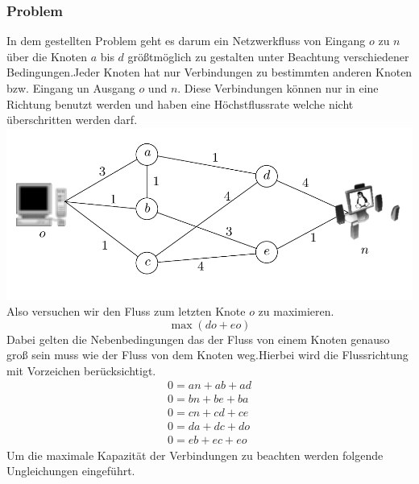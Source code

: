 \subsubsection{Problem}
	In dem gestellten Problem geht es darum ein Netzwerkfluss von Eingang $o$ zu $n$ über die Knoten $a$ bis $d$ größtmöglich zu gestalten unter Beachtung verschiedener Bedingungen.Jeder Knoten hat nur Verbindungen zu bestimmten anderen Knoten bzw. Eingang un Ausgang $o$ und $n$. Diese Verbindungen können nur in eine Richtung benutzt werden und haben eine Höchstflussrate welche nicht überschritten werden darf. 
	\includegraphics[width=\textwidth]{Grafiken/Netzwerkfluss_Bild.png}
	Also versuchen wir den Fluss zum letzten Knote $o$ zu maximieren.
	\[ \max(do+eo) \]
	Dabei gelten die Nebenbedingungen das der Fluss von einem Knoten genauso groß sein muss wie der Fluss von dem Knoten weg.Hierbei wird die Flussrichtung mit Vorzeichen berücksichtigt.
	\begin{align*}
		0=an+ab+ad\\
		0=bn+be+ba\\
		0=cn+cd+ce\\
		0=da+dc+do\\
		0=eb+ec+eo
	\end{align*}
	Um die maximale Kapazität der Verbindungen zu beachten werden folgende Ungleichungen eingeführt.

	